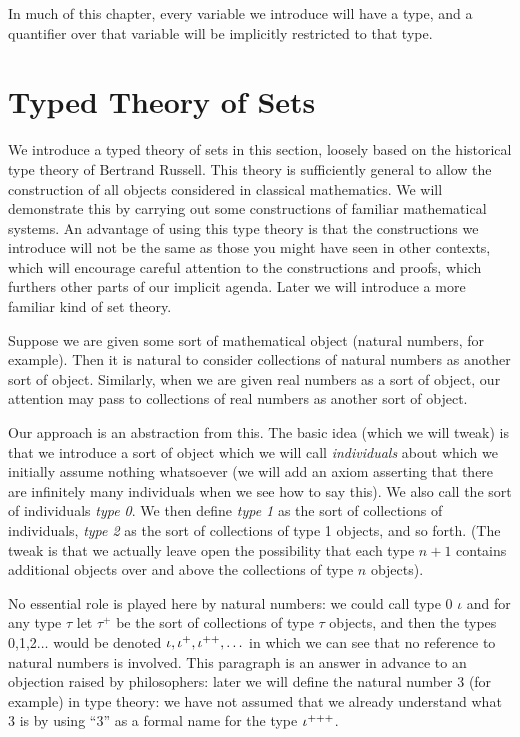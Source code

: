 \documentclass[12pt]{book}
\begin{document}
In much of this chapter, every variable
we introduce will have a type, and a quantifier over that variable
will be implicitly restricted to that type.

\section{Typed Theory of Sets}

We introduce a typed theory of sets in this section, loosely based on
the historical type theory of Bertrand Russell.  This theory is
sufficiently general to allow the construction of all objects
considered in classical mathematics.  We will demonstrate this by
carrying out some constructions of familiar mathematical systems.  An
advantage of using this type theory is that the constructions we
introduce will not be the same as those you might have seen in other
contexts, which will encourage careful attention to the constructions
and proofs, which furthers other parts of our implicit agenda.  Later
we will introduce a more familiar kind of set theory.

Suppose we are given some sort of mathematical object (natural
numbers, for example).  Then it is natural to consider collections of
natural numbers as another sort of object.  Similarly, when we are
given real numbers as a sort of object, our attention may pass to
collections of real numbers as another sort of object.

Our approach is an abstraction from this.  The basic idea (which we will tweak) is that we introduce a sort of
object which we will call {\em individuals\/} about which
we initially assume nothing whatsoever (we will add an axiom asserting
that there are infinitely many individuals when we see how to say
this).  We also call the sort of individuals {\em type 0\/}.  We then
define {\em type 1\/} as the sort of collections of individuals, {\em
type 2\/} as the sort of collections of type 1 objects, and so forth.
(The tweak is that we actually leave open the possibility that each type $n+1$ contains additional objects over and above the collections of type $n$ objects).

No essential role is played here by natural numbers: we could call
type 0 $\iota$ and for any type $\tau$ let $\tau^+$ be the sort of
collections of type $\tau$ objects, and then the types 0,1,2$\ldots$
would be denoted $\iota,\iota^+,\iota^{\bf ++},\ldots$ in which we can see
that no reference to natural numbers is involved.  This paragraph is
an answer in advance to an objection raised by philosophers: later we
will define the natural number 3 (for example) in type theory: we have
not assumed that we already understand what 3 is by using ``3'' as a
formal name for the type $\iota^{\bf +++}$.
\end{document}
